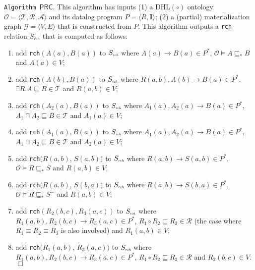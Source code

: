 \noindent\texttt{Algorithm~$\mathsf{PRC}$}. This algorithm has inputs (1)
a DHL$(\circ)$ ontology $\mathcal{O}=\langle\mathcal{T},\mathcal{R},\mathcal{A}\rangle$
and its datalog program $P=\langle R, \textbf{I}\rangle$;
(2) a (partial) materialization graph $\mathcal{G}=\langle V,E\rangle$ that is constructed from $P$.
This algorithm outputs a \texttt{rch} relation $S_{\textit{\tiny rch}}$ that
is computed as follows:

\begin{enumerate}[leftmargin=4ex,label=$\bullet$]
\item add \texttt{rch}$(A(a),B(a))$ to $S_{\textit{\tiny rch}}$ where $A(a)\rightarrow B(a)\in P^*$, $\mathcal{O}\models A\sqsubseteq_* B$ and $A(a)\in V$;

\item add \texttt{rch}$(A(b),B(a))$ to $S_{\textit{\tiny rch}}$ where $R(a,b),A(b)\rightarrow B(a)\in P^*$, $\exists R.A\sqsubseteq B\in\mathcal{T}$ and $R(a,b)\in V$;

\item add \texttt{rch}$(A_2(a),B(a))$ to $S_{\textit{\tiny rch}}$ where $A_1(a),A_2(a)\rightarrow B(a)\in P^*$,
    $A_1\sqcap A_2\sqsubseteq B\in\mathcal{T}$ and $A_1(a)\in V$;

\item add \texttt{rch}$(A_1(a),B(a))$ to $S_{\textit{\tiny rch}}$ where $A_1(a),A_2(a)\rightarrow B(a)\in P^*$,
    $A_1\sqcap A_2\sqsubseteq B\in\mathcal{T}$ and $A_2(a)\in V$;

\item add \texttt{rch}$(R(a,b)$, $S(a,b))$ to $S_{\textit{\tiny rch}}$ where $R(a,b)\rightarrow S(a,b)\in P^*$,
    $\mathcal{O}\models R\sqsubseteq_* S$ and $R(a,b)\in V$;

\item add \texttt{rch}$(R(a,b)$, $S(b,a))$ to $S_{\textit{\tiny rch}}$ where $R(a,b)\rightarrow S(b,a)\in P^*$,
    $\mathcal{O}\models R\sqsubseteq_* S^-$ and $R(a,b)\in V$;

\item add \texttt{rch}$(R_2(b,c),R_3(a,c))$ to $S_{\textit{\tiny rch}}$ where $R_1(a,b),R_2(b,c)\rightarrow R_3(a,c)\in P^*$,
    $R_1\circ R_2\sqsubseteq R_3\in\mathcal{R}$ (the case
    where $R_1\equiv R_2\equiv R_3$ is also involved) and $R_1(a,b)\in V$;

\item add \texttt{rch}$(R_1(a,b)$, $R_3(a,c))$ to $S_{\textit{\tiny rch}}$ where $R_1(a,b),R_2(b,c)\rightarrow R_3(a,c)\in P^*$,
    $R_1\circ R_2\sqsubseteq R_3\in\mathcal{R}$ and $R_2(b,c)\in V$.\hfill$\Box$
\end{enumerate}

